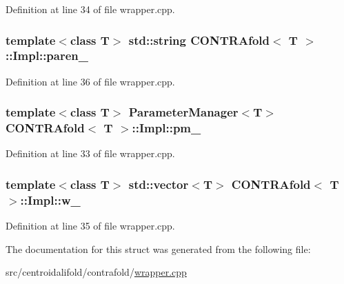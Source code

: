Definition at line 34 of file wrapper.\+cpp.

\hypertarget{struct_c_o_n_t_r_afold_1_1_impl_a1fecee16c367e647f3760913c5306623}{
\subsubsection[{paren\+\_\+}]{\setlength{\rightskip}{0pt plus 5cm}template$<$class T$>$ std\+::string {\bf C\+O\+N\+T\+R\+Afold}$<$ T $>$\+::Impl\+::paren\+\_\+}}\label{struct_c_o_n_t_r_afold_1_1_impl_a1fecee16c367e647f3760913c5306623}


Definition at line 36 of file wrapper.\+cpp.

\hypertarget{struct_c_o_n_t_r_afold_1_1_impl_ad2b5c0b67a930f6968a0f4200df70a7f}{
\subsubsection[{pm\+\_\+}]{\setlength{\rightskip}{0pt plus 5cm}template$<$class T$>$ {\bf Parameter\+Manager}$<$T$>$ {\bf C\+O\+N\+T\+R\+Afold}$<$ T $>$\+::Impl\+::pm\+\_\+}}\label{struct_c_o_n_t_r_afold_1_1_impl_ad2b5c0b67a930f6968a0f4200df70a7f}


Definition at line 33 of file wrapper.\+cpp.

\hypertarget{struct_c_o_n_t_r_afold_1_1_impl_a951858d815f6deeb4e4be5da4d0e328c}{
\subsubsection[{w\+\_\+}]{\setlength{\rightskip}{0pt plus 5cm}template$<$class T$>$ std\+::vector$<$T$>$ {\bf C\+O\+N\+T\+R\+Afold}$<$ T $>$\+::Impl\+::w\+\_\+}}\label{struct_c_o_n_t_r_afold_1_1_impl_a951858d815f6deeb4e4be5da4d0e328c}


Definition at line 35 of file wrapper.\+cpp.



The documentation for this struct was generated from the following file\+:\begin{DoxyCompactItemize}
\item 
src/centroidalifold/contrafold/\hyperlink{contrafold_2wrapper_8cpp}{wrapper.\+cpp}\end{DoxyCompactItemize}

